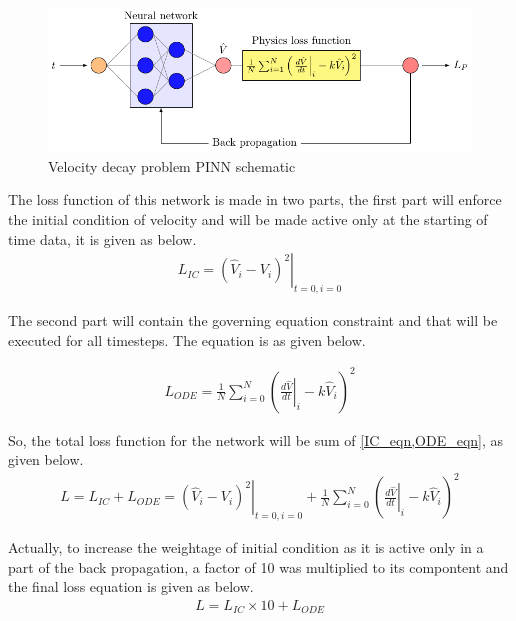 \begin{figure}
   \center
    \includegraphics[scale=1]{supportingFiles/01_schematics/05_velocity_PINN_network/velocity_PINN.pdf}
    \caption{Velocity decay problem PINN schematic}
    \label{velocity_decay_PINN_schematic}
\end{figure}

\par{}
The loss function of this network is made in two parts, the first part will enforce
the initial condition of velocity and will be made active only at the starting
of time data, it is given as below.
\begin{align}
    L_{IC} = \left.\left(\hat{V}_i - V_i\right)^2\right|_{t=0, i=0} \label{IC_eqn}
\end{align}

The second part will contain the governing equation constraint and that will be
executed for all timesteps. The equation is as given below.

\begin{align}
    L_{ODE} = \frac{1}{N}\sum_{i=0}^{N}\left(\left.\frac{d\hat{V}}{dt}\right\vert_i - k\hat{V}_i\right)^2 \label{ODE_eqn}
\end{align}

So, the total loss function for the network will be sum of \cref{IC_eqn,ODE_eqn},
as given below.
\begin{align}
    L = L_{IC}+L_{ODE} =  \left.\left(\hat{V}_i - V_i\right)^2\right|_{t=0, i=0}+\frac{1}{N}\sum_{i=0}^{N}\left(\left.\frac{d\hat{V}}{dt}\right\vert_i - k\hat{V}_i\right)^2 \label{velocity_decay_LF}
\end{align}

Actually, to increase the weightage of initial condition as it is active only
in a part of the back propagation, a factor of 10 was multiplied to its compontent
and the final loss equation is given as below.
\begin{align}
    L = L_{IC} \times 10+L_{ODE} \label{velocity_decay_PINN_LF}
\end{align}

